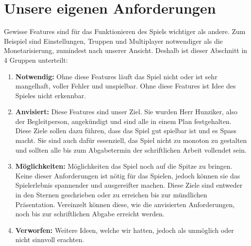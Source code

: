 \section{Unsere eigenen Anforderungen}
Gewisse Features sind für das Funktionieren des Spiels wichtiger als andere.
Zum Beispiel sind Einstellungen, Truppen und Multiplayer notwendiger als die Monetarisierung, zumindest nach unserer Ansicht.
Deshalb ist dieser Abschnitt in 4 Gruppen unterteilt:
\begin{enumerate}
    \item \textbf{Notwendig:}
        Ohne diese Features läuft das Spiel nicht oder ist sehr mangelhaft,
        voller Fehler und unspielbar. Ohne diese Features ist Idee des Spieles nicht erkennbar.
    \item \textbf{Anvisiert:}
        Diese Features sind unser Ziel. Sie wurden Herr Hunziker, also der Begleitperson, angekündigt und sind alle in einem Plan festgehalten.
        Diese Ziele sollen dazu führen, dass das Spiel
        gut spielbar ist und es Spass macht. Sie sind auch dafür essenziell, das Spiel nicht zu monoton zu gestalten und sollten
        alle bis zum Abgabetermin der schriftlichen Arbeit vollendet sein.
    \item \textbf{Möglichkeiten:}
        Möglichkeiten das Spiel noch auf die Spitze zu bringen. Keine dieser Anforderungen ist nötig
        für das Spielen, jedoch können sie das Spielerlebnis spannender und ausgereifter machen. Diese
        Ziele sind entweder in den Sternen geschrieben oder zu erreichen bis zur mündlichen Präsentation.
        Vereinzelt können diese, wie die anvisierten Anforderungen, noch bis zur schriftlichen Abgabe erreicht werden.
    \item \textbf{Verworfen:}
        Weitere Ideen, welche wir hatten, jedoch als unmöglich oder nicht sinnvoll erachten.
\end{enumerate}

